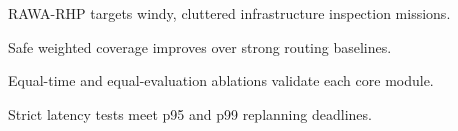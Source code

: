 \begin{highlights}
\item RAWA-RHP targets windy, cluttered infrastructure inspection missions.
\item Safe weighted coverage improves over strong routing baselines.
\item Equal-time and equal-evaluation ablations validate each core module.
\item Strict latency tests meet p95 and p99 replanning deadlines.
\end{highlights}
